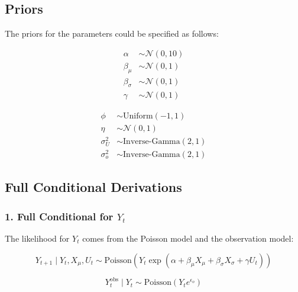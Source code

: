 \documentclass[
  letterpaper,
  DIV=11,
  numbers=noendperiod]{scrartcl}
\begin{document}
\subsection{Priors}\label{priors}

The priors for the parameters could be specified as follows:

\begin{subequations}
\begin{align}
\alpha &\sim \mathcal{N}(0, 10) \\ 
\beta_{\mu} &\sim \mathcal{N}(0, 1) \\
\beta_{\sigma} &\sim \mathcal{N}(0, 1) \\ 
\gamma &\sim \mathcal{N}(0, 1)
\end{align}
\end{subequations}

\begin{subequations}
\begin{align}
\phi &\sim \text{Uniform}(-1, 1) \\ 
\eta &\sim \mathcal{N}(0, 1)  \\ 
\sigma_U^2 &\sim \text{Inverse-Gamma}(2, 1) \\
\sigma_o^2 &\sim \text{Inverse-Gamma}(2, 1) 
\end{align}
\end{subequations}

\subsection{Full Conditional
Derivations}\label{full-conditional-derivations}

\subsubsection{\texorpdfstring{1. Full Conditional for
\(Y_t\)}{1. Full Conditional for Y\_t}}\label{full-conditional-for-y_t}

The likelihood for \(Y_t\) comes from the Poisson model and the
observation model:

\begin{equation}
Y_{t+1} \mid Y_t, X_{\mu}, U_t \sim \text{Poisson}\left( Y_t \exp(\alpha + \beta_{\mu} X_{\mu} + \beta_{\sigma} X_{\sigma} + \gamma U_t) \right)
\end{equation}

\begin{equation}
Y_t^{\text{obs}} \mid Y_t \sim \text{Poisson}(Y_t e^{\epsilon_o})
\end{equation}
\end{document}
